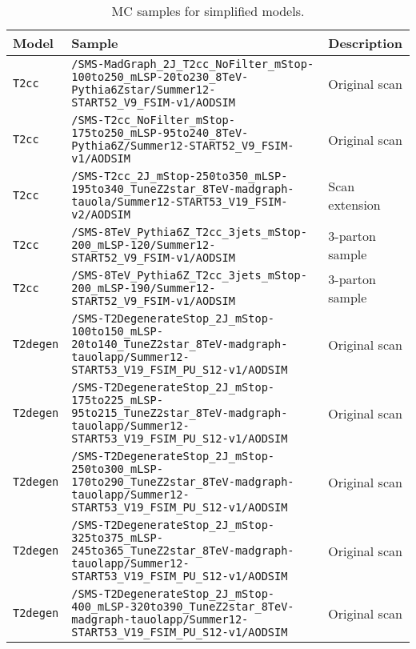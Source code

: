 \begin{landscape}
  \begin{center}
    \begin{table}[ht]
      \caption{MC samples for simplified models.}
      \label{tab:mc-signal}
      \centering
      \tiny
      \begin{tabular}{ lll }
        \hline
        Model & Sample & Description \\
        \hline
        \hline
        \verb!T2cc!     & \verb!/SMS-MadGraph_2J_T2cc_NoFilter_mStop-100to250_mLSP-20to230_8TeV-Pythia6Zstar/Summer12-START52_V9_FSIM-v1/AODSIM! & Original scan \\
        \verb!T2cc!     & \verb!/SMS-T2cc_NoFilter_mStop-175to250_mLSP-95to240_8TeV-Pythia6Z/Summer12-START52_V9_FSIM-v1/AODSIM! & Original scan \\
        \verb!T2cc!     & \verb!/SMS-T2cc_2J_mStop-250to350_mLSP-195to340_TuneZ2star_8TeV-madgraph-tauola/Summer12-START53_V19_FSIM-v2/AODSIM! & Scan extension \\
        \verb!T2cc!     & \verb!/SMS-8TeV_Pythia6Z_T2cc_3jets_mStop-200_mLSP-120/Summer12-START52_V9_FSIM-v1/AODSIM! & 3-parton sample \\
        \verb!T2cc!     & \verb!/SMS-8TeV_Pythia6Z_T2cc_3jets_mStop-200_mLSP-190/Summer12-START52_V9_FSIM-v1/AODSIM! & 3-parton sample \\
        \verb!T2degen!  & \verb!/SMS-T2DegenerateStop_2J_mStop-100to150_mLSP-20to140_TuneZ2star_8TeV-madgraph-tauolapp/Summer12-START53_V19_FSIM_PU_S12-v1/AODSIM! & Original scan \\
        \verb!T2degen!  & \verb!/SMS-T2DegenerateStop_2J_mStop-175to225_mLSP-95to215_TuneZ2star_8TeV-madgraph-tauolapp/Summer12-START53_V19_FSIM_PU_S12-v1/AODSIM! & Original scan \\
        \verb!T2degen!  & \verb!/SMS-T2DegenerateStop_2J_mStop-250to300_mLSP-170to290_TuneZ2star_8TeV-madgraph-tauolapp/Summer12-START53_V19_FSIM_PU_S12-v1/AODSIM! & Original scan \\
        \verb!T2degen!  & \verb!/SMS-T2DegenerateStop_2J_mStop-325to375_mLSP-245to365_TuneZ2star_8TeV-madgraph-tauolapp/Summer12-START53_V19_FSIM_PU_S12-v1/AODSIM! & Original scan \\
        \verb!T2degen!  & \verb!/SMS-T2DegenerateStop_2J_mStop-400_mLSP-320to390_TuneZ2star_8TeV-madgraph-tauolapp/Summer12-START53_V19_FSIM_PU_S12-v1/AODSIM! & Original scan \\
        \hline
        \hline
      \end{tabular}
    \end{table}
  \end{center}
\end{landscape}

